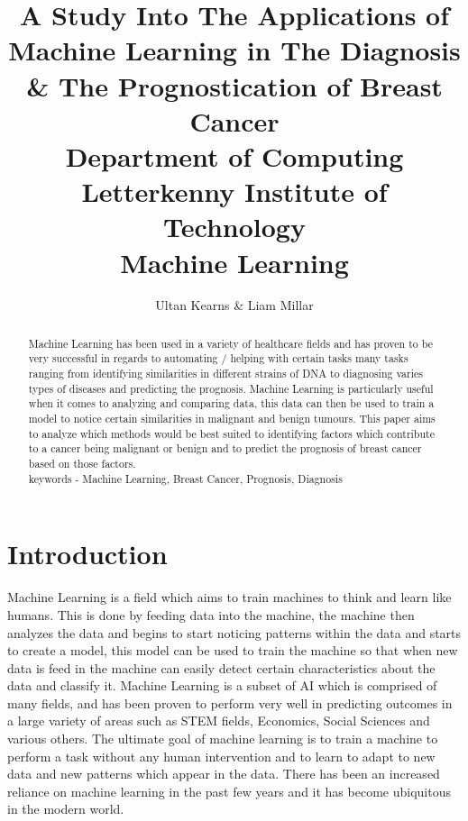 \documentclass[conference]{IEEEtran}
\begin{document}
\title{
A Study Into The Applications of Machine Learning in The Diagnosis \& The Prognostication of Breast Cancer\\
\vspace{5mm}
\large Department of Computing \\
\vspace{3mm} 
\large Letterkenny Institute of Technology \\
\vspace{3mm} 
\large Machine Learning
}
\vspace{3mm}  
\author{Ultan Kearns \& Liam Millar}
\maketitle
\begin{abstract}
    Machine Learning has been used in a variety of healthcare fields and has proven to be very successful in regards to automating / helping with certain tasks many tasks ranging from identifying similarities in different strains of DNA to diagnosing varies types of diseases and predicting the prognosis.  Machine Learning is particularly useful when it comes to analyzing and comparing data, this data can then be used to train a model to notice certain similarities in malignant and benign tumours.  This paper aims to analyze which methods would be best suited to identifying factors which contribute to a cancer being malignant or benign and to predict the prognosis of breast cancer based on those factors.\\
    keywords - Machine Learning, Breast Cancer, Prognosis, Diagnosis
\end{abstract}

\section{Introduction}
Machine Learning is a field which aims to train machines to think and learn like humans.  This is done by feeding data into the machine, the machine then analyzes the data and begins to start noticing patterns within the data and starts to create a model, this model can be used to train the machine so that when new data is feed in the machine can easily detect certain characteristics about the data and classify it.  Machine Learning is a subset of AI which is comprised of many fields, and has been proven to perform very well in predicting outcomes in a large variety of areas such as STEM fields, Economics, Social Sciences and various others.  The ultimate goal of machine learning is to train a machine to perform a task without any human intervention and to learn to adapt to new data and new patterns which appear in the data.  There has been an increased reliance on machine learning in the past few years and it has become ubiquitous in the modern world.\\
\end{document}
